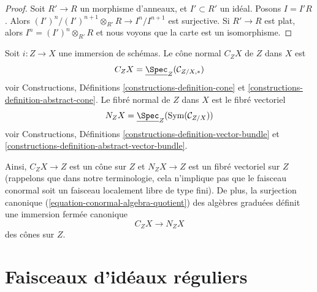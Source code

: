 \begin{proof}
Soit  $R' \to R$  un morphisme d'anneaux, et  $I' \subset R'$  un idéal. Posons
 $I = I'R$. Alors  $(I')^n/(I')^{n + 1} \otimes_{R'} R \to I^n/I^{n + 1}$  est surjective. Si  $R' \to R$  est plat, alors
 $I^n = (I')^n \otimes_{R'} R$  et nous voyons que la carte est un isomorphisme.
\end{proof}

\begin{definition}
\label{definition-normal-cone}
Soit  $i : Z \to X$  une immersion de schémas. Le cône normal
 {\it   $C_ZX$}  de  $Z$  dans
 $X$  est
$$
C_ZX = \underline{\Spec}_Z(\mathcal{C}_{Z/X, *})
$$
voir Constructions, Définitions  \ref{constructions-definition-cone}  et  \ref{constructions-definition-abstract-cone}. Le fibré normal
 {\it }  de  $Z$  dans  $X$  est le
fibré vectoriel
$$
N_ZX = \underline{\Spec}_Z(\text{Sym}(\mathcal{C}_{Z/X}))
$$
voir Constructions, Définitions  \ref{constructions-definition-vector-bundle}  et  \ref{constructions-definition-abstract-vector-bundle}.
\end{definition}

\noindent
Ainsi,  $C_ZX \to Z$  est un cône sur  $Z$  et  $N_ZX \to Z$  est un fibré
vectoriel sur  $Z$  (rappelons que dans notre terminologie, cela n'implique
pas que le faisceau conormal soit un faisceau localement libre de type fini). De
plus, la surjection canonique (\ref{equation-conormal-algebra-quotient}) des algèbres graduées définit une
immersion fermée canonique
\begin{equation}
\label{equation-normal-cone-in-normal-bundle}
C_ZX \longrightarrow N_ZX
\end{equation}
des cônes sur  $Z$.





\section{Faisceaux d'idéaux réguliers}
\label{section-regular-ideal-sheaves}


